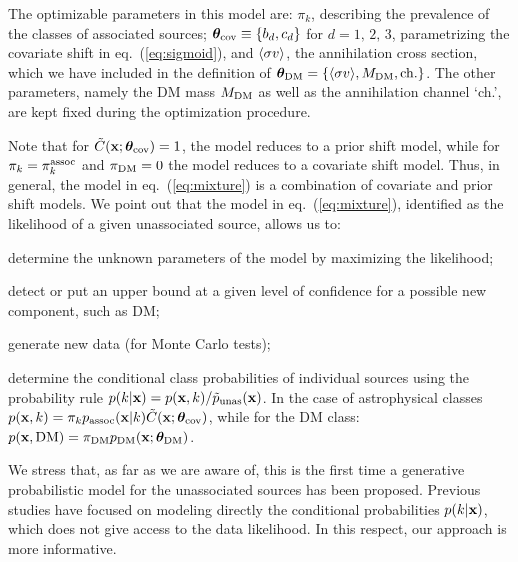 The optimizable parameters in this model are: $\pi_k$, describing the prevalence of the classes of associated sources; $\boldsymbol{\theta}_{\rm cov}\equiv\{b_d,c_d\}$ for $d = 1,\,2,\,3$, parametrizing the covariate shift in eq.~(\ref{eq:sigmoid}), and $\langle \sigma v \rangle$, the annihilation cross section, which we have included in the definition of $\boldsymbol{\theta}_{\rm DM}=\{\langle \sigma v \rangle,{M_\textrm{DM}},{\rm ch.}\}$. The other parameters, namely the DM mass ${M_\textrm{DM}}$ as well as the annihilation channel `ch.', are kept fixed during the optimization procedure.

Note that for $\tilde{C}(\textbf{x}; \boldsymbol{\theta}_{\rm cov}) = 1$, the model reduces to a prior shift model, while for $\pi_k = \pi_k^{\rm assoc}$ and $\pi_{\rm DM} = 0$ the model reduces to a covariate shift model.
Thus, in general, the model in eq.~(\ref{eq:mixture}) is a combination of covariate and prior shift models. We point out that the model in eq.~(\ref{eq:mixture}), identified as the likelihood of a given unassociated source, allows us to:
\ben
\item
determine the unknown parameters of the model by maximizing the likelihood;
\item
detect or put an upper bound at a given level of confidence for a possible new component, such as DM;
\item
generate new data (for Monte Carlo tests);
\item
determine the conditional class probabilities of individual sources using the probability rule
$p(k|\textbf{x}) = p(\textbf{x}, k)/\tilde{p}_{\rm unas}(\textbf{x})$. In the case of astrophysical classes 
$p(\textbf{x}, k) = \pi_k p_{\rm assoc}(\textbf{x}|k) \tilde{C}(\textbf{x}; \boldsymbol{\theta}_{\rm cov})$, while
for the DM class: $p(\textbf{x}, {\rm DM}) = \pi_{\rm DM} p_{\rm DM}(\textbf{x}; \boldsymbol{\theta}_{\rm DM})$.
\een

We stress that, as far as we are aware of, this is the first time a generative probabilistic model for the unassociated sources has been proposed. Previous studies have focused on modeling directly the conditional probabilities $p(k|\textbf{x})$, which does not give access to the data likelihood. In this respect, our approach is more informative.
